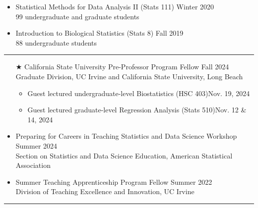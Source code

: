 \documentclass{article}
\begin{document}
\begin{description}
\begin{itemize}
			\item Statistical Methods for Data Analysis II (Stats 111) \hfill{Winter 2020}\\
			99 undergraduate and graduate students %
			
			\item Introduction to Biological Statistics (Stats 8) \hfill{Fall 2019}\\
			88 undergraduate students %
		\end{itemize}
		
	\end{description}
	\vspace{-2mm}
	\rule{\linewidth}{1pt}
	
	
	
	
	\begin{description}
		\vspace{-2mm}
		\item[Teaching Preparation]\hspace*{.1in}
		
		\begin{itemize}
			\item[$\bigstar$] California State University Pre-Professor Program Fellow \hfill{Fall 2024}\\
			Graduate Division, UC Irvine and California State University, Long Beach
			\begin{itemize}
				\item Guest lectured undergraduate-level Biostatistics (HSC 403)\hfill{Nov. 19, 2024}
				\item Guest lectured graduate-level Regression Analysis (Stats 510)\hfill{Nov. 12 \& 14, 2024}
			\end{itemize}
			
			
			\item Preparing for Careers in Teaching Statistics and Data Science Workshop \hfill{Summer 2024}\\
			Section on Statistics and Data Science Education, American Statistical Association 
			
			\item Summer Teaching Apprenticeship Program Fellow \hfill{Summer 2022}\\
			Division of Teaching Excellence and Innovation, UC Irvine
			
		\end{itemize}
	\end{description}
	\vspace{-2mm}
	\rule{\linewidth}{1pt}
	
\end{document}
